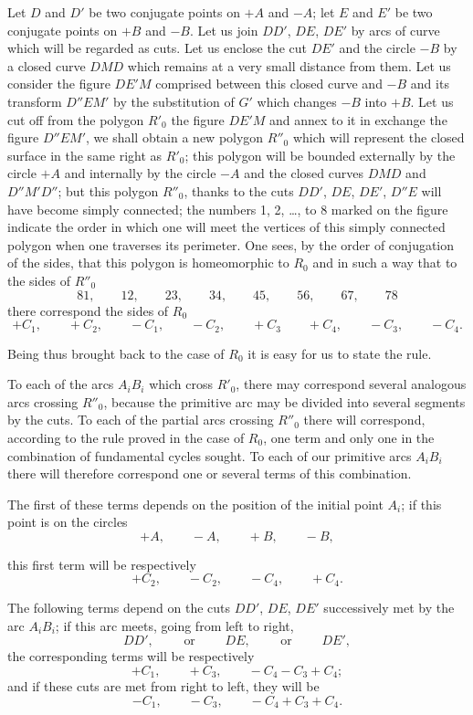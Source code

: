 \documentclass{article}
\begin{document}
Let $D$ and $D'$ be two conjugate points on $+A$ and $-A$; let $E$ and $E'$ be two conjugate points on $+B$ and $-B$. Let us join $DD'$, $DE$, $DE'$ by arcs of curve which will be regarded as cuts. Let us enclose the cut $DE'$ and the circle $-B$ by a closed curve $DMD$ which remains at a very small distance from them. Let us consider the figure $DE'M$ comprised between this closed curve and $-B$ and its transform $D''EM'$ by the substitution of $G'$ which changes $-B$ into $+B$. Let us cut off from the polygon $R'_{0}$ the figure $DE'M$ and annex to it in exchange the figure $D''EM'$, we shall obtain a new polygon $R''_{0}$ which will represent the closed surface in the same right as $R'_{0}$; this polygon will be bounded externally by the circle $+A$ and internally by the circle $-A$ and the closed curves $DMD$ and $D''M'D''$; but this polygon $R''_{0}$, thanks to the cuts $DD'$, $DE$, $DE'$, $D''E$ will have become simply connected; the numbers 1, 2, \ldots, to 8 marked on the figure indicate the order in which one will meet the vertices of this simply connected polygon when one traverses its perimeter. One sees, by the order of conjugation of the sides, that this polygon is homeomorphic to $R_{0}$ and in such a way that to the sides of $R''_{0}$
\[ 81, \qquad 12, \qquad 23, \qquad 34, \qquad 45, \qquad 56, \qquad 67, \qquad 78 \]
there correspond the sides of $R_{0}$
\[ +C_{1}, \qquad +C_{2}, \qquad -C_{1}, \qquad -C_{2}, \qquad +C_{3} \qquad +C_{4}, \qquad -C_{3}, \qquad -C_{4}. \]

Being thus brought back to the case of $R_{0}$ it is easy for us to state the rule.

To each of the arcs $A_{i}B_{i}$ which cross $R'_{0}$, there may correspond several analogous arcs crossing $R''_{0}$, because the primitive arc may be divided into several segments by the cuts. To each of the partial arcs crossing $R''_{0}$ there will correspond, according to the rule proved in the case of $R_{0}$, one term and only one in the combination of fundamental cycles sought. To each of our primitive arcs $A_{i}B_{i}$ there will therefore correspond one or several terms of this combination.

The first of these terms depends on the position of the initial point $A_{i}$; if this point is on the circles
\[ +A, \qquad -A, \qquad +B, \qquad -B, \]

this first term will be respectively
\[ +C_{2}, \qquad -C_{2}, \qquad -C_{4}, \qquad +C_{4}. \]

The following terms depend on the cuts $DD'$, $DE$, $DE'$ successively met by the arc $A_{i}B_{i}$; if this arc meets, going from left to right,
\[ DD', \qquad \text{ or } \qquad DE, \qquad \text{ or } \qquad DE', \]
the corresponding terms will be respectively
\[ +C_{1}, \qquad +C_{3}, \qquad -C_{4} - C_{3} + C_{4}; \]
and if these cuts are met from right to left, they will be
\[ -C_{1}, \qquad -C_{3}, \qquad -C_{4} + C_{3} + C_{4}. \]
\end{document}
